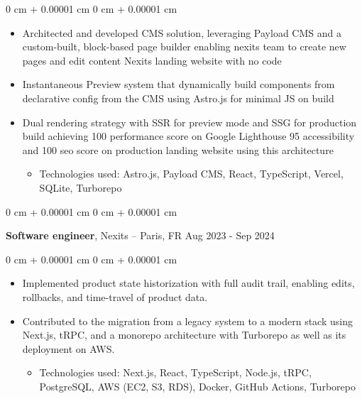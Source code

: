 \documentclass[10pt, letterpaper]{article}
\newenvironment{highlights}{
  \begin{itemize}[
    topsep=0.10 cm,
    parsep=0.10 cm,
    partopsep=0pt,
    itemsep=0pt,
    leftmargin=0 cm + 10pt
    ]
  }{
\end{itemize}
}
\newenvironment{highlightsforbulletentries}{
  \begin{itemize}[
    topsep=0.10 cm,
    parsep=0.10 cm,
    partopsep=0pt,
    itemsep=0pt,
    leftmargin=10pt
    ]
  }{
\end{itemize}
} %
\newenvironment{onecolentry}{
  \begin{adjustwidth}{
      0 cm + 0.00001 cm
    }{
      0 cm + 0.00001 cm
    }
  }{
  \end{adjustwidth}
} %
\newenvironment{twocolentry}[2][]{
  \onecolentry
  \def\secondColumn{#2}
  \setcolumnwidth{\fill, 4.5 cm}
  \begin{paracol}{2}
  }{
    \switchcolumn \raggedleft \secondColumn
  \end{paracol}
  \end{onecolentry}
} %
\begin{document}
  \vspace{0.10 cm}
  \begin{onecolentry}
    \begin{highlights}
    \item Architected and developed CMS solution,
      leveraging Payload CMS and a custom-built, block-based page builder enabling nexits team to create new pages and edit content Nexits landing website with no code
    \item 
      Instantaneous Preview system that dynamically build components from declarative config from the CMS using Astro.js for minimal JS on build
    \item Dual rendering strategy with SSR for preview mode and SSG for production build achieving 100 performance score on Google Lighthouse 95 accessibility and 100 seo score on production landing website using this architecture 

          \begin{highlightsforbulletentries}
    \item Technologies used: Astro.js, Payload CMS, React, TypeScript, Vercel, SQLite, Turborepo
    \end{highlightsforbulletentries}

    \end{highlights}

  \end{onecolentry}




  \begin{twocolentry}{
      Aug 2023 - Sep 2024
    }
  \textbf{Software engineer}, Nexits  -- Paris, FR\end{twocolentry}

  \vspace{0.10 cm}
  \begin{onecolentry}
    \begin{highlights}

    \item Implemented product state historization with full audit trail, enabling edits, rollbacks, and time-travel of product data.

    \item Contributed to the migration from a legacy system to a modern stack using Next.js, tRPC, and a monorepo architecture with Turborepo as well as its deployment on AWS.

                \begin{highlightsforbulletentries}
    \item Technologies used: Next.js, React, TypeScript, Node.js, tRPC, PostgreSQL, AWS (EC2, S3, RDS), Docker, GitHub Actions, Turborepo
    \end{highlightsforbulletentries}


    \end{highlights}

  \end{onecolentry}
\end{document}
